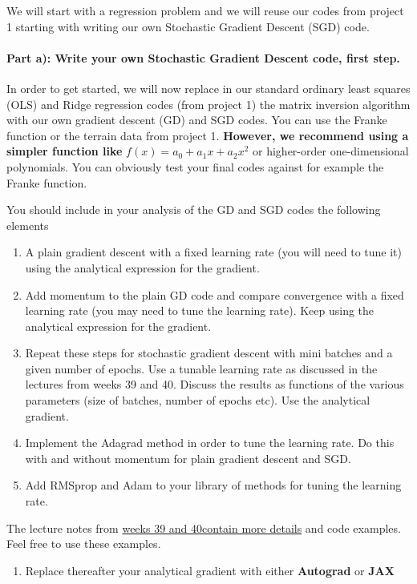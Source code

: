 \documentclass[%
oneside,                 %
final,                   %
10pt]{article}
\begin{document}
We will start with a regression problem and we will reuse our codes from project 1 starting with writing our own Stochastic Gradient Descent (SGD) code. 

\paragraph{Part a): Write your own Stochastic Gradient Descent  code, first step.}
In order to get started, we will now replace in our standard ordinary
least squares (OLS) and Ridge regression codes (from project 1) the
matrix inversion algorithm with our own gradient descent (GD) and SGD
codes.  You can use the Franke function or the terrain data from
project 1. \textbf{However, we recommend using a simpler function like}
$f(x)=a_0+a_1x+a_2x^2$ or higher-order one-dimensional polynomials.
You can obviously test your final codes against for example the Franke
function.

You should include in your analysis of the GD and SGD codes the following elements
\begin{enumerate}
\item A plain gradient descent with a fixed learning rate (you will need to tune it) using the analytical expression for the gradient.

\item Add momentum to the plain GD code and compare convergence with a fixed learning rate (you may need to tune the learning rate). Keep using the analytical expression for the gradient.

\item Repeat these steps for stochastic gradient descent with mini batches and a given number of epochs. Use a tunable learning rate as discussed in the lectures from weeks 39 and 40. Discuss the results as functions of the various parameters (size of batches, number of epochs etc). Use the analytical gradient.

\item Implement the Adagrad method in order to tune the learning rate. Do this with and without momentum for plain gradient descent and SGD.

\item Add RMSprop and Adam to your library of methods for tuning the learning rate.
\end{enumerate}

\noindent
The lecture notes from \href{{https://compphysics.github.io/MachineLearning/doc/pub/week39/html/week39.html}}{weeks 39 and 40contain more
details} and code examples. Feel free to use these examples.
\begin{enumerate}
\item Replace thereafter your analytical gradient with either \textbf{Autograd} or \textbf{JAX}
\end{enumerate}
\end{document}

